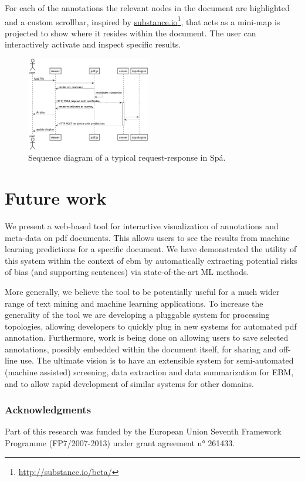 \documentclass[runningheads,a4paper]{llncs}
\begin{document}
For each of the annotations the relevant nodes in the document are highlighted and a custom scrollbar, inspired by \href{http://substance.io/}{substance.io}\footnote{\url{http://substance.io/beta/}}, that acts as a mini-map is projected to show where it resides within the document.
The user can interactively activate and inspect specific results.
\label{section:architecture}
\begin{figure}
  \begin{center}
    \includegraphics[width=0.48\textwidth]{./diagrams/sequence.pdf}
  \end{center}
  \caption{\label{fig:sequence}Sequence diagram of a typical request-response in Spá.}
\end{figure}

\section{Future work}
We present a web-based tool for interactive visualization of annotations and meta-data on \ac{pdf} documents.
This allows users to see the results from machine learning predictions for a specific document.
We have demonstrated the utility of this system within the context of \ac{ebm} by automatically extracting potential risks of bias (and supporting sentences) via state-of-the-art ML methods.

More generally, we believe the tool to be potentially useful for a much wider range of text mining and machine learning applications.
To increase the generality of the tool we are developing a pluggable system for processing topologies, allowing developers to quickly plug in new systems for automated \ac{pdf} annotation.
Furthermore, work is being done on allowing users to save selected annotations, possibly embedded within the document itself, for sharing and off-line use.
The ultimate vision is to have an extensible system for semi-automated (machine assisted) screening, data extraction and data summarization for EBM, and to allow rapid development of similar systems for other domains.

\subsubsection{Acknowledgments}
Part of this research was funded by the European Union Seventh Framework Programme (FP7/2007-2013) under grant agreement n° 261433. %



\end{document}
